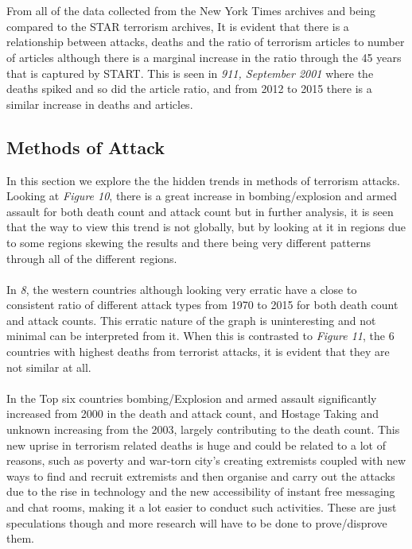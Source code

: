 \documentclass[10pt,a4paper]{article}
\begin{document}
\\\\ 
From all of the data collected from the New York Times archives and being compared to the STAR terrorism archives, It is evident that there is a relationship between attacks, deaths and the ratio of terrorism articles to number of articles although there is a marginal increase in the ratio through the 45 years that is captured by START. This is seen in \textit{911, September 2001} where the deaths spiked and so did the article ratio, and from 2012 to 2015 there is a similar increase in deaths and articles.



\subsection{Methods of Attack}
In this section we explore the the hidden trends in methods of terrorism attacks. Looking at \textit{Figure 10}, there is a great increase in bombing/explosion and armed assault for both death count and attack count but in further analysis, it is seen that the way to view this trend is not globally, but by looking at it in regions due to some regions skewing the results and there being very different patterns through all of the different regions.
\\\\
In \textit{8}, the western countries although looking very erratic have a close to consistent ratio of different attack types from 1970 to 2015 for both death count and attack counts. This erratic nature of the graph is uninteresting and not minimal can be interpreted from it. When this is contrasted to \textit{Figure 11}, the 6 countries with highest deaths from terrorist attacks, it is evident that they are not similar at all.
\\\\
In the Top six countries bombing/Explosion and armed assault significantly increased from 2000 in the death and attack count, and Hostage Taking and unknown increasing from the 2003, largely contributing to the death count. This new uprise in terrorism related deaths is huge and could be related to a lot of reasons, such as poverty and war-torn city’s creating extremists coupled with new ways to find and recruit extremists and then organise and carry out the attacks due to the rise in technology and the new accessibility of instant free messaging and chat rooms, making it a lot easier to conduct such activities. These are just speculations though and more research will have to be done to prove/disprove them.
\end{document}

